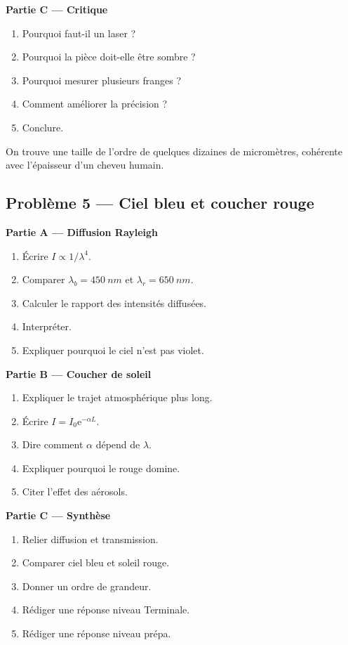 \documentclass[11pt,a4paper]{article}
\newcommand{\e}{\mathrm e}
\begin{document}
\textbf{Partie C — Critique}
\begin{enumerate}
  \item Pourquoi faut-il un laser ?
  \item Pourquoi la pièce doit-elle être sombre ?
  \item Pourquoi mesurer plusieurs franges ?
  \item Comment améliorer la précision ?
  \item Conclure.
\end{enumerate}

\begin{corrigebox}
On trouve une taille de l'ordre de quelques dizaines de micromètres, cohérente avec l'épaisseur d'un cheveu humain.
\end{corrigebox}

\subsection{Problème 5 — Ciel bleu et coucher rouge}

\textbf{Partie A — Diffusion Rayleigh}
\begin{enumerate}
  \item Écrire $I\propto1/\lambda^4$.
  \item Comparer $\lambda_b=\SI{450}{nm}$ et $\lambda_r=\SI{650}{nm}$.
  \item Calculer le rapport des intensités diffusées.
  \item Interpréter.
  \item Expliquer pourquoi le ciel n'est pas violet.
\end{enumerate}

\textbf{Partie B — Coucher de soleil}
\begin{enumerate}
  \item Expliquer le trajet atmosphérique plus long.
  \item Écrire $I=I_0\e^{-\alpha L}$.
  \item Dire comment $\alpha$ dépend de $\lambda$.
  \item Expliquer pourquoi le rouge domine.
  \item Citer l'effet des aérosols.
\end{enumerate}

\textbf{Partie C — Synthèse}
\begin{enumerate}
  \item Relier diffusion et transmission.
  \item Comparer ciel bleu et soleil rouge.
  \item Donner un ordre de grandeur.
  \item Rédiger une réponse niveau Terminale.
  \item Rédiger une réponse niveau prépa.
\end{enumerate}
\end{document}
